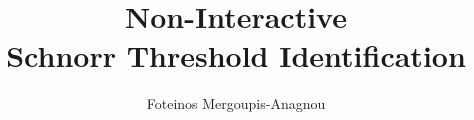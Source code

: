 \documentclass{iacrtrans}
\author{Foteinos Mergoupis-Anagnou}
\institute{Athens, Greece, \email{fmerg@grnet.gr}}
\title{Non-Interactive
\\Schnorr Threshold Identification}
\begin{document}
\maketitle




\makeatletter
\makeatother

\pagestyle{plain}






\newtheorem{thm}{Theorem}[section]
\newtheorem{cor}[thm]{Corollary}
\newtheorem{prop}[thm]{Proposition}
\newtheorem{lem}[thm]{Lemma}
\newtheorem{conj}[thm]{Conjecture}
\newtheorem{quest}[thm]{Question}

\theoremstyle{definition}
\newtheorem{defn}[thm]{Definition}
\newtheorem{defns}[thm]{Definitions}
\newtheorem{con}[thm]{Construction}
\newtheorem{exmp}[thm]{Example}
\newtheorem{exmps}[thm]{Examples}
\newtheorem{notn}[thm]{Notation}
\newtheorem{notns}[thm]{Notations}
\newtheorem{addm}[thm]{Addendum}
\newtheorem{exer}[thm]{Exercise}
\newtheorem{Theorem}[thm]{Theorem}
\newtheorem{attack_game}[thm]{Game}
\newtheorem{protocol}[thm]{Protocol}
\newtheorem{scheme}[thm]{Scheme}

\theoremstyle{definition}
\newtheorem{rem}[thm]{Remark}
\newtheorem{rems}[thm]{Remarks}
\newtheorem{warn}[thm]{Warning}
\newtheorem{sch}[thm]{Scholium}
\makeatletter
\let\c@equation\c@thm
\makeatother
{}
\end{document}
